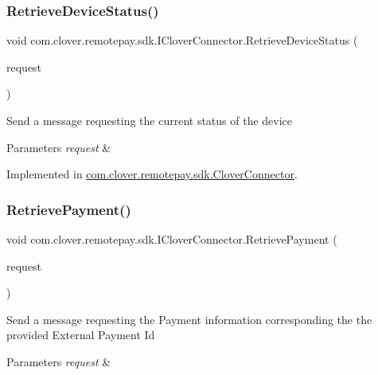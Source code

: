 \subsubsection{\texorpdfstring{Retrieve\+Device\+Status()}{RetrieveDeviceStatus()}}
{\footnotesize\ttfamily void com.\+clover.\+remotepay.\+sdk.\+I\+Clover\+Connector.\+Retrieve\+Device\+Status (\begin{DoxyParamCaption}\item[{Retrieve\+Device\+Status\+Request}]{request }\end{DoxyParamCaption})}



Send a message requesting the current status of the device 


\begin{DoxyParams}{Parameters}
{\em request} & \\
\hline
\end{DoxyParams}


Implemented in \hyperlink{classcom_1_1clover_1_1remotepay_1_1sdk_1_1_clover_connector_a7a5404c24cac6be283c80a7983bfa4eb}{com.\+clover.\+remotepay.\+sdk.\+Clover\+Connector}.

\mbox{\label{interfacecom_1_1clover_1_1remotepay_1_1sdk_1_1_i_clover_connector_a3b85cfdb92b7c64d9b27decc49ca8b7c}} 
\subsubsection{\texorpdfstring{Retrieve\+Payment()}{RetrievePayment()}}
{\footnotesize\ttfamily void com.\+clover.\+remotepay.\+sdk.\+I\+Clover\+Connector.\+Retrieve\+Payment (\begin{DoxyParamCaption}\item[{Retrieve\+Payment\+Request}]{request }\end{DoxyParamCaption})}



Send a message requesting the Payment information corresponding the the provided External Payment Id 


\begin{DoxyParams}{Parameters}
{\em request} & \\
\hline
\end{DoxyParams}


